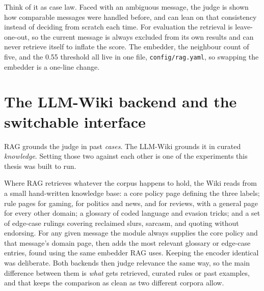 Think of it as case law. Faced with an ambiguous message, the judge is shown how comparable messages were handled before, and can lean on that consistency instead of deciding from scratch each time. For evaluation the retrieval is leave-one-out, so the current message is always excluded from its own results and can never retrieve itself to inflate the score. The embedder, the neighbour count of five, and the 0.55 threshold all live in one file, \texttt{config/rag.yaml}, so swapping the embedder is a one-line change.

\section{The LLM-Wiki backend and the switchable interface}\label{the-llm-wiki-backend-and-the-switchable-interface}

RAG grounds the judge in past \emph{cases}. The LLM-Wiki grounds it in curated \emph{knowledge}. Setting those two against each other is one of the experiments this thesis was built to run.

Where RAG retrieves whatever the corpus happens to hold, the Wiki reads from a small hand-written knowledge base: a core policy page defining the three labels; rule pages for gaming, for politics and news, and for reviews, with a general page for every other domain; a glossary of coded language and evasion tricks; and a set of edge-case rulings covering reclaimed slurs, sarcasm, and quoting without endorsing. For any given message the module always supplies the core policy and that message's domain page, then adds the most relevant glossary or edge-case entries, found using the same embedder RAG uses. Keeping the encoder identical was deliberate. Both backends then judge relevance the same way, so the main difference between them is \emph{what} gets retrieved, curated rules or past examples, and that keeps the comparison as clean as two different corpora allow.

